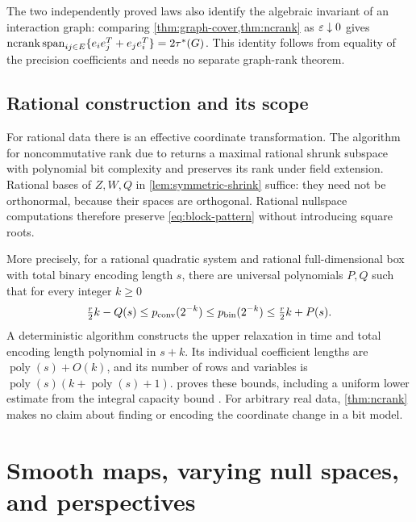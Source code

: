 The two independently proved laws also identify the algebraic invariant
of an interaction graph: comparing \cref{thm:graph-cover,thm:ncrank} as
$\varepsilon\downarrow0$ gives
$\operatorname{ncrank}\operatorname{span}_{ij\in E}\{e_ie_j^T+e_je_i^T\}=2\tau^*(G)$.
This identity follows from equality of the precision coefficients and
needs no separate graph-rank theorem.

\subsection{Rational construction and its scope}\label{subsec:rational-scope}

For rational data there is an effective coordinate transformation.
The algorithm for noncommutative rank due to
\citet[Theorem 1.5 and Lemma 5.3]{iqs2018} returns a maximal rational
shrunk subspace with polynomial bit complexity and preserves its rank
under field extension. Rational bases of $Z,W,Q$ in
\cref{lem:symmetric-shrink} suffice: they need not be orthonormal,
because their spaces are orthogonal. Rational nullspace computations
therefore preserve \eqref{eq:block-pattern} without introducing square
roots.

More precisely, for a rational quadratic system and rational
full-dimensional box with total binary encoding length $s$, there
are universal polynomials $P,Q$ such that for every integer $k\ge0$
\begin{equation}\label{eq:rational-rate-preview}
 \tfrac r2 k-Q(s)\le p_{\mathrm{conv}}(2^{-k})\le p_{\mathrm{bin}}(2^{-k})
                    \le\tfrac r2 k+P(s).
\end{equation}
A deterministic algorithm constructs the upper relaxation in time and
total encoding length polynomial in $s+k$. Its individual coefficient
lengths are $\operatorname{poly}(s)+O(k)$, and its number of rows and
variables is $\operatorname{poly}(s)(k+\operatorname{poly}(s)+1)$.
 proves these bounds, including a uniform
lower estimate from the integral capacity bound
\citep[Theorem 2.18]{ggow2020}. For arbitrary real data, \cref{thm:ncrank} makes no claim about finding or encoding
the coordinate change in a bit model.

\section{Smooth maps, varying null spaces, and perspectives}\label{sec:smooth}


